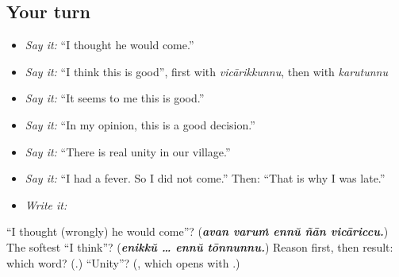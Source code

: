\subsection*{Your turn}
\begin{itemize}
\raggedright
  \item \emph{Say it:} \textquotedblleft{}I thought he would come.\textquotedblright{}
  \item \emph{Say it:} \textquotedblleft{}I think this is good\textquotedblright{}, first with \emph{vicārikkunnu}, then with \emph{karutunnu}
  \item \emph{Say it:} \textquotedblleft{}It seems to me this is good.\textquotedblright{}
  \item \emph{Say it:} \textquotedblleft{}In my opinion, this is a good decision.\textquotedblright{}
  \item \emph{Say it:} \textquotedblleft{}There is real unity in our village.\textquotedblright{}
  \item \emph{Say it:} \textquotedblleft{}I had a fever. So I did not come.\textquotedblright{} Then: \textquotedblleft{}That is why I was late.\textquotedblright{}
  \item \emph{Write it:} \textbf{}
\end{itemize}

\begin{tcolorbox}[breakable,colback=teal!4,colframe=teal!35!black,title={Before you move on}]
\textquotedblleft{}I thought (wrongly) he would come\textquotedblright{}? (\emph{\textbf{avan varuṁ ennŭ ñān vicāriccu.}}) The softest \textquotedblleft{}I think\textquotedblright{}? (\emph{\textbf{enikkŭ … ennŭ tōnnunnu.}}) Reason first, then result: which word? (\textbf{}.) \textquotedblleft{}Unity\textquotedblright{}? (\textbf{}, which opens with \textbf{}.)
\end{tcolorbox}
